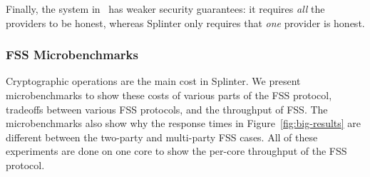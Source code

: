 Finally, the system in~\cite{goldberg} has weaker security guarantees:
it requires \textit{all} the providers to be honest, whereas Splinter
only requires that \textit{one} provider is honest. 




\subsubsection{FSS Microbenchmarks}
\label{sec:micro}
Cryptographic operations are the main
cost in Splinter.
We present microbenchmarks to show these costs of various
parts of the FSS protocol, 
tradeoffs between various FSS protocols,
and the throughput of FSS. The microbenchmarks
also show why the response times in Figure~\ref{fig:big-results} 
are different between the two-party and multi-party FSS cases.
All of these experiments are done on one core to show the 
per-core throughput of the FSS protocol.

